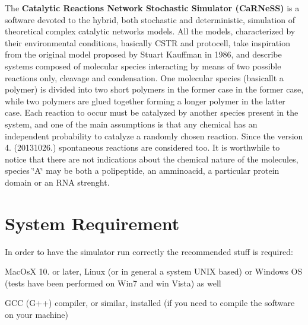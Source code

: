  The {\bfseries Catalytic Reactions Network Stochastic Simulator (Ca\+R\+Ne\+S\+S)} is a software devoted to the hybrid, both stochastic and deterministic, simulation of theoretical complex catalytic networks models. All the models, characterized by their environmental conditions, basically C\+S\+T\+R and protocell, take inspiration from the original model proposed by Stuart Kauffman in 1986, and describe systems composed of molecular species interacting by means of two possible reactions only, cleavage and condensation. One molecular species (basicallt a polymer) is divided into two short polymers in the former case in the former case, while two polymers are glued together forming a longer polymer in the latter case. Each reaction to occur must be catalyzed by another species present in the system, and one of the main assumptions is that any chemical has an independent probability to catalyze a randomly chosen reaction. Since the version 4. (20131026.) spontaneous reactions are considered too. It is worthwhile to notice that there are not indications about the chemical nature of the molecules, species \char`\"{}\+A\char`\"{} may be both a polipeptide, an amminoacid, a particular protein domain or an R\+N\+A strenght.~\newline
~\newline
 \hypertarget{a00002_sysreq}{}\section{System Requirement}\label{a00002_sysreq}


 In order to have the simulator run correctly the recommended stuff is required\+:
\begin{DoxyItemize}
\item Mac\+Os\+X 10. or later, Linux (or in general a system U\+N\+I\+X based) or Windows O\+S (tests have been performed on Win7 and win Vista) as well
\item G\+C\+C (G++) compiler, or similar, installed (if you need to compile the software on your machine)
\end{DoxyItemize}


